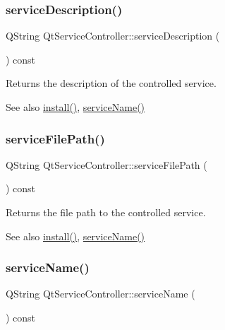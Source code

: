\subsubsection{\texorpdfstring{service\+Description()}{serviceDescription()}}
{\footnotesize\ttfamily Q\+String Qt\+Service\+Controller\+::service\+Description (\begin{DoxyParamCaption}{ }\end{DoxyParamCaption}) const}

Returns the description of the controlled service.

\begin{DoxySeeAlso}{See also}
\hyperlink{class_qt_service_controller_a7e2b85e911ff152557dd25959e76094b}{install()}, \hyperlink{class_qt_service_controller_a3df972ecd01a00fff5cda316ae35cbea}{service\+Name()} 
\end{DoxySeeAlso}
\mbox{\label{class_qt_service_controller_a5ab709fdeb3ab526c92ccbbe1b2706c6}} 
\subsubsection{\texorpdfstring{service\+File\+Path()}{serviceFilePath()}}
{\footnotesize\ttfamily Q\+String Qt\+Service\+Controller\+::service\+File\+Path (\begin{DoxyParamCaption}{ }\end{DoxyParamCaption}) const}

Returns the file path to the controlled service.

\begin{DoxySeeAlso}{See also}
\hyperlink{class_qt_service_controller_a7e2b85e911ff152557dd25959e76094b}{install()}, \hyperlink{class_qt_service_controller_a3df972ecd01a00fff5cda316ae35cbea}{service\+Name()} 
\end{DoxySeeAlso}
\mbox{\label{class_qt_service_controller_a3df972ecd01a00fff5cda316ae35cbea}} 
\subsubsection{\texorpdfstring{service\+Name()}{serviceName()}}
{\footnotesize\ttfamily Q\+String Qt\+Service\+Controller\+::service\+Name (\begin{DoxyParamCaption}{ }\end{DoxyParamCaption}) const}

